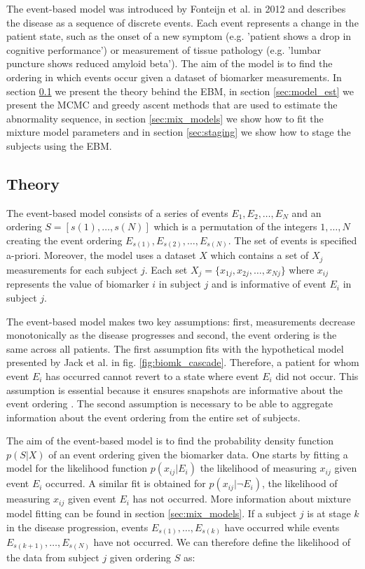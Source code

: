  
The event-based model was introduced by Fonteijn et al. \cite{fonteijn2012event} in 2012 and describes the disease as a sequence of discrete events. Each event represents a change in the patient state, such as the onset of a new symptom (e.g. 'patient shows a drop in cognitive performance') or measurement of tissue pathology (e.g. 'lumbar puncture shows reduced amyloid beta'). The aim of the model is to find the ordering in which events occur given a dataset of biomarker measurements. In section \ref{sec:ebm_theory} we present the theory behind the EBM, in section \ref{sec:model_est} we present the MCMC and greedy ascent methods that are used to estimate the abnormality sequence, in section \ref{sec:mix_models} we show how to fit the mixture model parameters and in section \ref{sec:staging} we show how to stage the subjects using the EBM. 

\subsection{Theory}
\label{sec:ebm_theory}

The event-based model consists of a series of events $E_1, E_2, \dots , E_N$ and an ordering $S = [s(1), \dots, s(N)]$ which is a permutation of the integers $1,\dots, N$ creating the event ordering $E_{s(1)}, E_{s(2)},\dots, E_{s(N)}$. The set of events is specified a-priori.  Moreover, the model uses a dataset $X$ which contains a set of $X_j$ measurements for each subject $j$. Each set $X_j = \{x_{1j}, x_{2j}, \dots, x_{Nj}\}$ where $x_{ij}$ represents the value of biomarker $i$ in subject $j$ and is informative of event $E_i$ in subject $j$. 

The event-based model makes two key assumptions: first, measurements decrease monotonically as the disease progresses and second, the event ordering is the same across all patients. The first assumption fits with the hypothetical model presented by Jack et al. \cite{jack2010hypothetical} in fig. \ref{fig:biomk_cascade}. Therefore, a patient for whom event $E_i$ has occurred cannot revert to a state where event $E_i$ did not occur. This assumption is essential because it ensures snapshots are informative about the event ordering \cite{fonteijn2012event}. The second assumption is necessary to be able to aggregate information about the event ordering from the entire set of subjects. 

The aim of the event-based model is to find the probability density function  $p(S|X)$ of an event ordering given the biomarker data. One starts by fitting a model for the likelihood function $p(x_{ij}|E_i)$ the likelihood of measuring $x_{ij}$ given event $E_i$ occurred. A similar fit is obtained for $p(x_{ij}|\neg E_i)$, the likelihood of measuring $x_{ij}$ given event $E_i$ has not occurred. More information about mixture model fitting can be found in section \ref{sec:mix_models}. If a subject $j$ is at stage $k$ in the disease progression, events $E_{s(1)},\dots, E_{s(k)}$ have occurred while events $E_{s(k+1)},\dots, E_{s(N)}$ have not occurred. We can therefore define the likelihood of the data from subject $j$ given ordering $S$ as:

